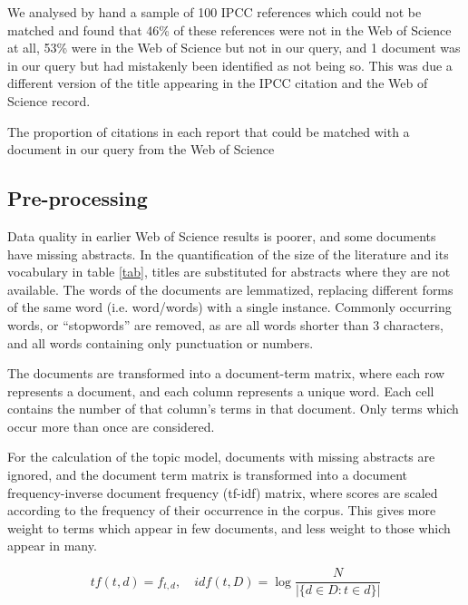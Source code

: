 \documentclass{article}
\begin{document}
\begin{linenumbers}
		We analysed by hand a sample of 100 IPCC references which could not be matched and found that 46\% of these references were not in the Web of Science at all, 53\% were in the Web of Science but not in our query, and 1 document was in our query but had mistakenly been identified as not being so. This was due a different version of the title appearing in the IPCC citation and the Web of Science record. 
		
		
		\begin{table}[htp]
			\begin{center}
				
				\caption{The proportion of citations in each report that could be matched with a document in our query from the Web of Science}
				\label{ipcc-matching}
			\end{center}
		\end{table}
		
		
		\subsection*{Pre-processing}
		
		Data quality in earlier Web of Science results is poorer, and some documents have missing abstracts. In the quantification of the size of the literature and its vocabulary in table \ref{tab}, titles are substituted for abstracts where they are not available.  The words of the documents are lemmatized, replacing different forms of the same word (i.e. word/words) with a single instance. Commonly occurring words, or ``stopwords'' are removed, as are all words shorter than 3 characters, and all words containing only punctuation or numbers.
		
		The documents are transformed into a document-term matrix, where each row represents a document, and each column represents a unique word.  Each cell contains the number of that column's terms in that document. Only terms which occur more than once are considered.
		
		For the calculation of the topic model, documents with missing abstracts are ignored, and the document term matrix is transformed into a document
		frequency-inverse document frequency (tf-idf) matrix, where scores are scaled according to the frequency of their occurrence in the corpus. This gives more weight to terms which appear in few documents, and less weight to those which appear in many.
		
		\begin{equation}
		tf(t,d) = f_{t,d} \mathrm{,}\quad idf(t,D) = \log\frac{N}{|\{d \in D:t \in d\}|}
		\end{equation} 
		

\end{linenumbers}
\end{document}
